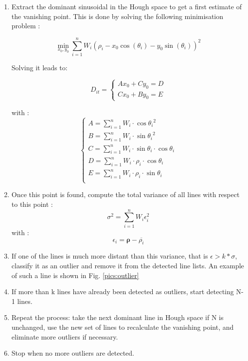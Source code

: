 \begin{enumerate}
  \item Extract the dominant sinusoidal in the Hough space to get a first estimate of the vanishing point. This is done by solving the following minimisation problem : 
  
  \begin{equation}
\min_{x_{0}, y_{0}} \sum_{i=1}^{n} W_{i}(\rho_{i} - x_{0} \cos(\theta_{i}) - y_{0} \sin(\theta_{i}))^2
 	\label{eq:my_equation}
\end{equation}

Solving it leads to: 


\begin{equation}
  D_{it} =
    \begin{cases}
    A x_0 + C y_0 = D \\
    C x_0 + B y_0 = E
    \end{cases}       
\end{equation}

with : 
\begin{equation}
    \begin{cases}
      A = \sum_{i=1}^{n} W_{i} \cdot \cos{\theta_{i}}^2 \\
      B = \sum_{i=1}^{n} W_{i}\cdot  \sin{\theta_{i}}^2 \\
      C = \sum_{i=1}^{n} W_{i} \cdot \sin{\theta_{i}} \cdot \cos{\theta_{i}} \\
      D = \sum_{i=1}^{n} W_{i} \cdot \rho_i \cdot \cos{\theta_{i}}     \\
      E = \sum_{i=1}^{n} W_{i} \cdot \rho_i \cdot \sin{\theta_{i}}   \\

      \end{cases}
\end{equation}

  \item Once this point is found, compute the total variance of all lines with respect to this point : 
\begin{equation}
    \sigma^2 = \sum_{i=1}^{n} W_{i}  \epsilon_i^2
\end{equation}
    with : %
\begin{equation}
    \epsilon_i =  \boldsymbol{\rho} -  \overline{\rho_{i}} 
\end{equation}

  
  \item If one of the lines is much more distant than this variance, that is \(\epsilon>k* \sigma\), classify it as an outlier and remove it from the detected line lists. An example of such a line is shown in Fig. \ref{pics:outlier}
  \item If more than k lines have already been detected as outliers, start detecting N-1 lines.
  \item Repeat the process: take the next dominant line in Hough space if N is unchanged, use the new set of lines to recalculate the vanishing point, and eliminate more outliers if necessary. 
  \item Stop when no more outliers are detected.

\end{enumerate}

